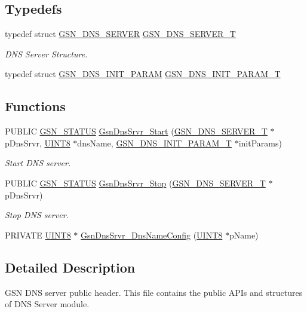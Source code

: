 \subsection*{Typedefs}
\begin{DoxyCompactItemize}
\item 
typedef struct \hyperlink{a00055}{GSN\_\-DNS\_\-SERVER} \hyperlink{a00662_ga85fc2373f7b6a2cfb0ebbbddb036c503}{GSN\_\-DNS\_\-SERVER\_\-T}
\begin{DoxyCompactList}\small\item\em DNS Server Structure. \end{DoxyCompactList}\item 
typedef struct \hyperlink{a00054}{GSN\_\-DNS\_\-INIT\_\-PARAM} \hyperlink{a00485_aaf7f0a05b9144f9843da3a9e5c814ace}{GSN\_\-DNS\_\-INIT\_\-PARAM\_\-T}
\end{DoxyCompactItemize}
\subsection*{Functions}
\begin{DoxyCompactItemize}
\item 
PUBLIC \hyperlink{a00660_gada5951904ac6110b1fa95e51a9ddc217}{GSN\_\-STATUS} \hyperlink{a00662_gab5a185ee52c26ad8cc547eff1f40bd9c}{GsnDnsSrvr\_\-Start} (\hyperlink{a00055}{GSN\_\-DNS\_\-SERVER\_\-T} $\ast$pDnsSrvr, \hyperlink{a00660_gab27e9918b538ce9d8ca692479b375b6a}{UINT8} $\ast$dnsName, \hyperlink{a00054}{GSN\_\-DNS\_\-INIT\_\-PARAM\_\-T} $\ast$initParams)
\begin{DoxyCompactList}\small\item\em Start DNS server. \end{DoxyCompactList}\item 
PUBLIC \hyperlink{a00660_gada5951904ac6110b1fa95e51a9ddc217}{GSN\_\-STATUS} \hyperlink{a00662_ga61e9319652de6fc7065c3779896c4188}{GsnDnsSrvr\_\-Stop} (\hyperlink{a00055}{GSN\_\-DNS\_\-SERVER\_\-T} $\ast$pDnsSrvr)
\begin{DoxyCompactList}\small\item\em Stop DNS server. \end{DoxyCompactList}\item 
PRIVATE \hyperlink{a00660_gab27e9918b538ce9d8ca692479b375b6a}{UINT8} $\ast$ \hyperlink{a00485_a365a4708d02688a6532460cb25056c6d}{GsnDnsSrvr\_\-DnsNameConfig} (\hyperlink{a00660_gab27e9918b538ce9d8ca692479b375b6a}{UINT8} $\ast$pName)
\end{DoxyCompactItemize}


\subsection{Detailed Description}
GSN DNS server public header. This file contains the public APIs and structures of DNS Server module. 

